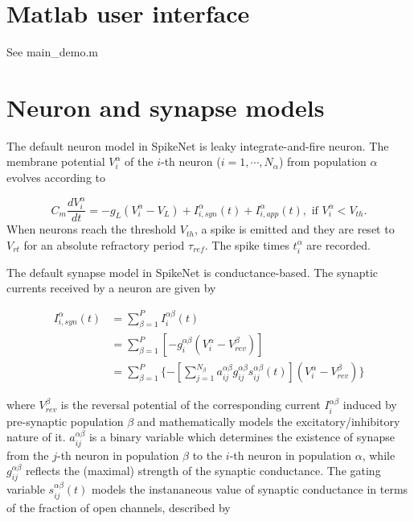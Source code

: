 \documentclass{article}
\begin{document}
\section{Matlab user interface}
See main_demo.m

\label{sec:matlab user interface}

\section{Neuron and synapse models}
\label{sec:model}



The default neuron model in SpikeNet is leaky integrate-and-fire neuron. 
The membrane potential $V^{\alpha}_{i}$ of the $i$-th neuron ($i=1,\cdots,N_{\alpha}$) from population $\alpha$ evolves according to

\begin{equation}
C_{m}\frac{dV^{\alpha}_{i}}{dt} = -g_{L}(V^{\alpha}_{i}-V_{L}) + I^{\alpha}_{i,syn}(t) + I^{\alpha}_{i,app}(t), \text{ if } V^{\alpha}_{i} < V_{th}.
\end{equation}
When neurons reach the threshold $V_{th}$, a spike is emitted and they are reset to $V_{rt}$ for an absolute refractory period $\tau_{ref}$. 
The spike times $t^{\alpha}_{i}$ are recorded.

The default synapse model in SpikeNet is conductance-based. 
The synaptic currents received by a neuron are given by

\begin{align}
I^{\alpha}_{i,syn}(t) &= \sum_{\beta=1}^{P}I^{\alpha\beta}_{i}(t) \\
 &= \sum_{\beta=1}^{P}[-g_{i}^{\alpha\beta}(V^{\alpha}_{i}-V_{rev}^{\beta})] \\
 &= \sum_{\beta=1}^{P}\{-[\sum_{j=1}^{N_{\beta}}a_{ij}^{\alpha\beta}g_{ij}^{\alpha\beta}s_{ij}^{\alpha\beta}(t)](V^{\alpha}_{i}-V_{rev}^{\beta})\}\label{eq:I_syn}
\end{align}


\noindent
where $V_{rev}^{\beta}$ is the reversal potential of the corresponding current $I^{\alpha\beta}_{i}$ induced by pre-synaptic population $\beta$ and mathematically models the excitatory/inhibitory nature of it. 
$a_{ij}^{\alpha\beta}$ is a binary variable which determines the existence of synapse from the $j$-th neuron in population $\beta$ to the $i$-th neuron in  population $\alpha$, while $g_{ij}^{\alpha\beta}$ reflects the (maximal) strength of the synaptic conductance. 
The gating variable $s_{ij}^{\alpha\beta}(t)$ models the instananeous value of synaptic conductance in terms of the fraction of open channels, described by
\end{document}
